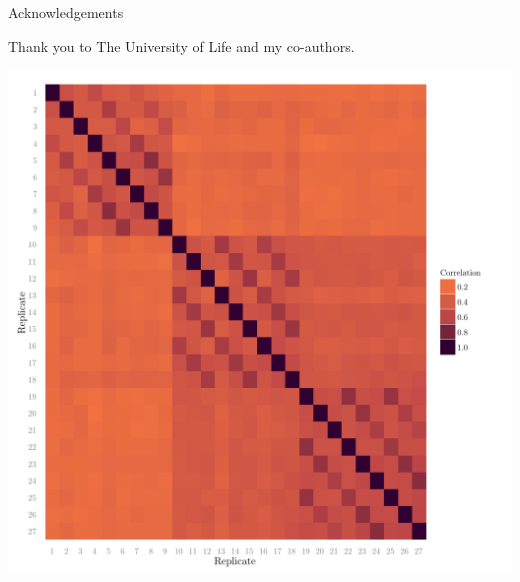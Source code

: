 \documentclass{beamer}
\begin{document}
\begin{frame}{Acknowledgements}


Thank you to The University of Life and my co-authors.



\begin{flushright} 
	\includegraphics[height=0.1\textheight]{fig/corr.pdf}
\end{flushright}



\end{frame}
\end{document}
